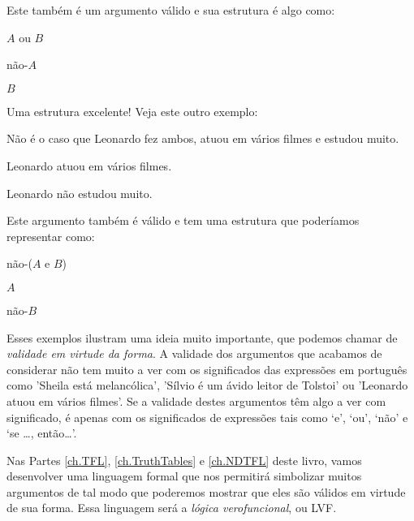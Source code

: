 Este também é um argumento válido e sua estrutura é algo como:
	\begin{earg}
		\item[] $A$ ou $B$
		\item[] não-$A$
		\item[\therefore] $B$
	\end{earg}
Uma estrutura excelente! Veja este outro exemplo:
	\begin{earg}
		\item[] Não é o caso que Leonardo fez ambos, atuou em vários filmes e estudou muito.
		\item[] Leonardo atuou em vários filmes.
		\item[\therefore] Leonardo não estudou muito.
	\end{earg}
Este argumento também é válido e tem uma estrutura que poderíamos representar como:
	\begin{earg}
		\item[] não-($A$ e $B$)
		\item[] $A$
		\item[\therefore] não-$B$
	\end{earg}
Esses exemplos ilustram uma ideia muito importante, que podemos chamar de \emph{validade em virtude da forma}.
A validade dos argumentos que acabamos de considerar não tem muito a ver com os significados das expressões em português como 'Sheila está melancólica', 'Sílvio é um ávido leitor de Tolstoi' ou 'Leonardo atuou em vários filmes'.
Se a validade destes argumentos têm algo a ver com significado, é apenas com os significados de expressões tais como `e', `ou', `não' e `se \ldots, então\ldots'.

Nas Partes \ref{ch.TFL}, \ref{ch.TruthTables} e \ref{ch.NDTFL} deste livro, vamos desenvolver uma linguagem formal que nos permitirá simbolizar muitos argumentos de tal modo que poderemos mostrar que eles são válidos em virtude de sua forma.
Essa linguagem será a \emph{lógica verofuncional}, ou LVF.


